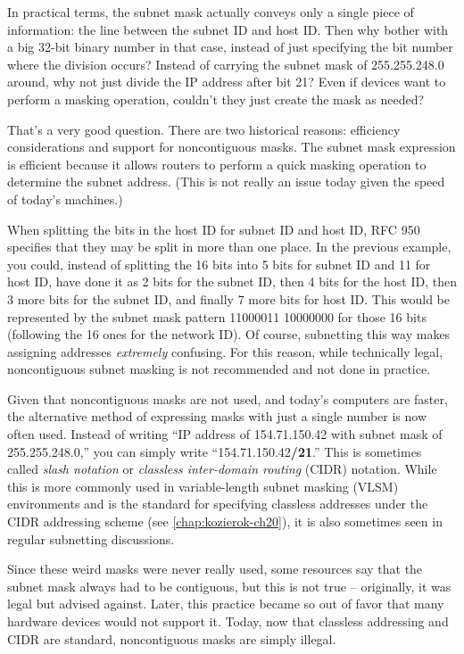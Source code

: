 In practical terms, the subnet mask actually conveys only a single piece
of information: the line between the subnet ID and host ID. Then why
bother with a big 32-bit binary number in that case, instead of just
specifying the bit number where the division occurs? Instead of carrying
the subnet mask of 255.255.248.0 around, why not just divide the IP
address after bit 21? Even if devices want to perform a masking
operation, couldn't they just create the mask as needed?

That's a very good question. There are two historical reasons:
efficiency considerations and support for
noncontiguous
masks. The subnet mask expression is efficient because it allows routers
to perform a quick masking operation to determine the subnet address.
(This is not really an issue today given the speed of today's machines.)

When splitting the bits in the host ID for subnet ID and host ID, RFC
950 specifies that they may be split in more than one place. In the
previous example, you could, instead of splitting the 16 bits into 5
bits for subnet ID and 11 for host ID, have done it as 2 bits for the
subnet ID, then 4 bits for the host ID, then 3 more bits for the subnet
ID, and finally 7 more bits for host ID. This would be represented by
the subnet mask pattern 11000011 10000000 for those 16 bits (following
the 16 ones for the network ID). Of course, subnetting this way makes
assigning addresses \emph{extremely} confusing.
For this reason, while technically legal, noncontiguous subnet masking is not recommended and not done in practice.

Given that noncontiguous masks are not used, and today's computers are
faster, the alternative method of expressing masks with just a single
number is now often used. Instead of writing
``IP address of 154.71.150.42 with subnet mask of 255.255.248.0,'' you can simply
write ``154.71.150.42\textbf{/21}.''
This is sometimes called \emph{slash notation} or \emph{classless inter-domain routing} (CIDR) notation.
While this is more commonly used in variable-length subnet masking (VLSM) environments and is the standard for specifying classless addresses under the CIDR addressing scheme (see \vref{chap:kozierok-ch20}), it is also sometimes seen in regular subnetting discussions.

\begin{note}
Since these weird masks were never really used, some resources
say that the subnet mask always had to be contiguous, but this is not true -- originally, it was legal but advised against.
Later, this practice became so out of favor that many hardware devices would not support it.
Today, now that classless addressing and CIDR are standard, noncontiguous masks are simply illegal.
\end{note}




